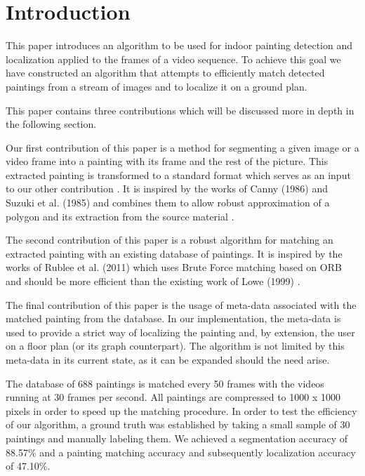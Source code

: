 \section{Introduction}	
This paper introduces an algorithm to be used for indoor painting detection and localization applied to the frames of a video sequence. To achieve this goal we have constructed an algorithm that attempts to efficiently match detected paintings from a stream of images and to localize it on a ground plan.

This paper contains three contributions which will be discussed more in depth in the following section.


Our first contribution of this paper is a method for segmenting a given image or a video frame into a painting with its frame and the rest of the picture. This extracted painting is transformed to a standard format which serves as an input to our other contribution . It is inspired by the works of Canny (1986) \cite{Canny1986} and Suzuki et al. (1985) \cite{SUZUKI198532} and combines them to allow robust approximation of a polygon and its extraction from the source material .


The second contribution of this paper is a robust algorithm for matching an extracted painting with an existing database of paintings. It is inspired by the works of Rublee et al. (2011) \cite{Rublee2011} which uses Brute Force matching based on ORB and should be more efficient than the existing work of Lowe (1999) .


The final contribution of this paper is the usage of meta-data associated with the matched painting from the database. In our implementation, the meta-data is used to provide a strict way of localizing the painting and, by extension, the user on a floor plan (or its graph counterpart). The algorithm is not limited by this meta-data in its current state, as it can be expanded should the need arise.

The database of 688 paintings is matched every 50 frames with the videos running at 30 frames per second. All paintings are compressed to 1000 x 1000 pixels in order to speed up the matching procedure. In order to test the efficiency of our algorithm, a ground truth was established by taking a small sample of 30 paintings and manually labeling them. We achieved a segmentation accuracy of 88.57\% and a painting matching accuracy and subsequently localization accuracy of 47.10\%.

